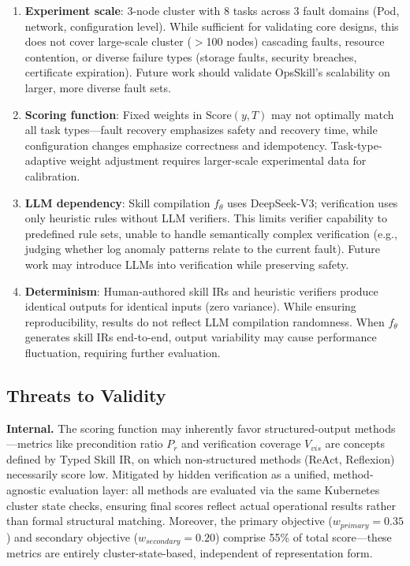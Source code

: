 \documentclass[conference,10pt]{IEEEtran}
\begin{document}
\begin{enumerate}
  \item \textbf{Experiment scale}: 3-node cluster with 8 tasks across 3 fault domains (Pod, network, configuration level).
  While sufficient for validating core designs, this does not cover large-scale cluster ($>$100 nodes) cascading faults, resource contention, or diverse failure types (storage faults, security breaches, certificate expiration).
  Future work should validate OpsSkill's scalability on larger, more diverse fault sets.
  \item \textbf{Scoring function}: Fixed weights in $\text{Score}(y, T)$ may not optimally match all task types---fault recovery emphasizes safety and recovery time, while configuration changes emphasize correctness and idempotency.
  Task-type-adaptive weight adjustment requires larger-scale experimental data for calibration.
  \item \textbf{LLM dependency}: Skill compilation $f_\theta$ uses DeepSeek-V3; verification uses only heuristic rules without LLM verifiers.
  This limits verifier capability to predefined rule sets, unable to handle semantically complex verification (e.g., judging whether log anomaly patterns relate to the current fault).
  Future work may introduce LLMs into verification while preserving safety.
  \item \textbf{Determinism}: Human-authored skill IRs and heuristic verifiers produce identical outputs for identical inputs (zero variance).
  While ensuring reproducibility, results do not reflect LLM compilation randomness.
  When $f_\theta$ generates skill IRs end-to-end, output variability may cause performance fluctuation, requiring further evaluation.
\end{enumerate}

\subsection{Threats to Validity}

\textbf{Internal.}
The scoring function may inherently favor structured-output methods---metrics like precondition ratio $P_r$ and verification coverage $V_{vis}$ are concepts defined by Typed Skill IR, on which non-structured methods (ReAct, Reflexion) necessarily score low.
Mitigated by hidden verification as a unified, method-agnostic evaluation layer: all methods are evaluated via the same Kubernetes cluster state checks, ensuring final scores reflect actual operational results rather than formal structural matching.
Moreover, the primary objective ($w_{primary}=0.35$) and secondary objective ($w_{secondary}=0.20$) comprise 55\% of total score---these metrics are entirely cluster-state-based, independent of representation form.
\end{document}
